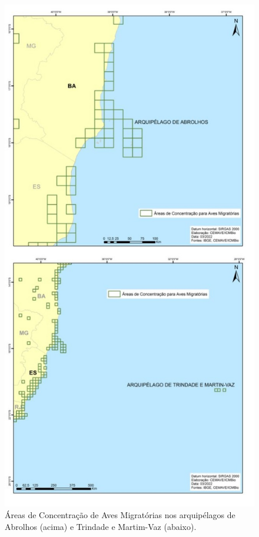 \documentclass[
  oneside]{scrbook}
\begin{document}
\begin{figure}[H]

{\centering \includegraphics[width=0.7\linewidth]{imagens/cap07/Fig_25_AB_MV} 

}

\caption{Áreas de Concentração de Aves Migratórias nos arquipélagos de Abrolhos (acima) e Trindade e Martim-Vaz (abaixo).}\label{fig:45}
\end{figure}
\end{document}
